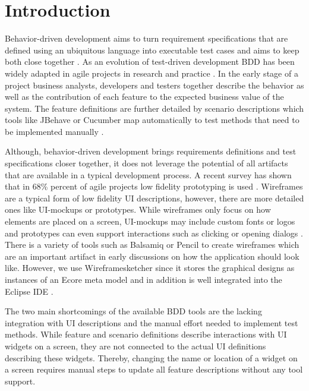 \documentclass{sig-alternate-05-2015}
\begin{document}
%
%
\printccsdesc



\section{Introduction}
Behavior-driven development aims to turn requirement specifications that are defined using an ubiquitous language into executable test cases and aims to keep both close together \cite{DanNorth}.
As an evolution of test-driven development BDD has been widely adapted in agile projects in research and practice \cite{C.Solis.2011}.
In the early stage of a project business analysts, developers and testers together describe the behavior as well as the contribution of each feature to the expected business value of the system.
The feature definitions are further detailed by scenario descriptions which tools like JBehave or Cucumber map automatically to test methods that need to be implemented manually \cite{wynne2012cucumber}.

Although, behavior-driven development brings requirements definitions and test specifications closer together, it does not leverage the potential of all artifacts that are available in a typical development process.
A recent survey has shown that in 68\% percent of agile projects low fidelity prototyping is used \cite{Hussain2009}.
Wireframes are a typical form of low fidelity UI descriptions, however, there are more detailed ones like UI-mockups or prototypes.
While wireframes only focus on how elements are placed on a screen, UI-mockups may include custom fonts or logos and prototypes can even support interactions such as clicking or opening dialogs \cite{Coyette2007}. 
There is a variety of tools such as Balsamiq \cite{Balsamiq} or Pencil \cite{Pencil} to create wireframes which are an important artifact in early discussions on how the application should look like.
However, we use Wireframesketcher since it stores the graphical designs as instances of an Ecore meta model and in addition is well integrated into the Eclipse IDE \cite{Wireframesketcher}.

The two main shortcomings of the available BDD tools are the lacking integration with UI descriptions and the manual effort needed to implement test methods.
While feature and scenario definitions describe interactions with UI widgets on a screen, they are not connected to the actual UI definitions describing these widgets.
Thereby, changing the name or location of a widget on a screen requires manual steps to update all feature descriptions without any tool support.
\end{document}
